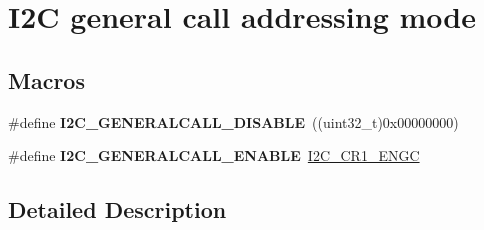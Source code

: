 \hypertarget{group___i2_c__general__call__addressing__mode}{\section{I2\-C general call addressing mode}
\label{group___i2_c__general__call__addressing__mode}
}
\subsection*{Macros}
\begin{DoxyCompactItemize}
\item 
\hypertarget{group___i2_c__general__call__addressing__mode_ga14918ea7d2b23cd67c66b49ebbf5c0a8}{\#define {\bfseries I2\-C\-\_\-\-G\-E\-N\-E\-R\-A\-L\-C\-A\-L\-L\-\_\-\-D\-I\-S\-A\-B\-L\-E}~((uint32\-\_\-t)0x00000000)}\label{group___i2_c__general__call__addressing__mode_ga14918ea7d2b23cd67c66b49ebbf5c0a8}

\item 
\hypertarget{group___i2_c__general__call__addressing__mode_ga5ec9ec869e4c78a597c5007c245c01a0}{\#define {\bfseries I2\-C\-\_\-\-G\-E\-N\-E\-R\-A\-L\-C\-A\-L\-L\-\_\-\-E\-N\-A\-B\-L\-E}~\hyperlink{group___peripheral___registers___bits___definition_ga1d8c219193b11f8507d7b85831d14912}{I2\-C\-\_\-\-C\-R1\-\_\-\-E\-N\-G\-C}}\label{group___i2_c__general__call__addressing__mode_ga5ec9ec869e4c78a597c5007c245c01a0}

\end{DoxyCompactItemize}


\subsection{Detailed Description}

